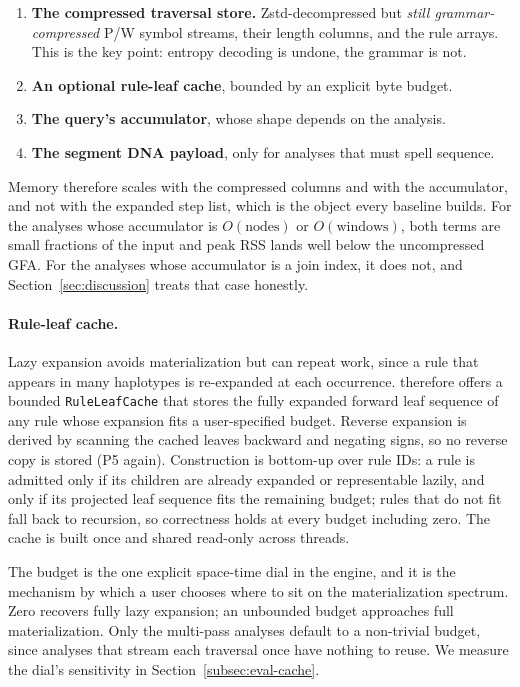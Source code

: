 \begin{enumerate}[noitemsep,topsep=3pt,leftmargin=*]
  \item \textbf{The compressed traversal store.} Zstd-decompressed but
        \emph{still grammar-compressed} P/W symbol streams, their length columns,
        and the rule arrays. This is the key point: entropy decoding is undone,
        the grammar is not.
  \item \textbf{An optional rule-leaf cache}, bounded by an explicit byte budget.
  \item \textbf{The query's accumulator}, whose shape depends on the analysis.
  \item \textbf{The segment DNA payload}, only for analyses that must spell
        sequence.
\end{enumerate}

Memory therefore scales with the compressed columns and with the accumulator, and
not with the expanded step list, which is the object every baseline builds. For
the analyses whose accumulator is $O(\text{nodes})$ or $O(\text{windows})$, both
terms are small fractions of the input and peak RSS lands well below the
uncompressed GFA. For the analyses whose accumulator is a join index, it does not,
and Section~\ref{sec:discussion} treats that case honestly.

\paragraph{Rule-leaf cache.}
Lazy expansion avoids materialization but can repeat work, since a rule that
appears in many haplotypes is re-expanded at each occurrence. \sys therefore
offers a bounded \texttt{RuleLeafCache} that stores the fully expanded forward
leaf sequence of any rule whose expansion fits a user-specified budget. Reverse
expansion is derived by scanning the cached leaves backward and negating signs, so
no reverse copy is stored (P5 again). Construction is bottom-up over rule IDs: a
rule is admitted only if its children are already expanded or representable
lazily, and only if its projected leaf sequence fits the remaining budget; rules
that do not fit fall back to recursion, so correctness holds at every budget
including zero. The cache is built once and shared read-only across threads.

The budget is the one explicit space-time dial in the engine, and it is the
mechanism by which a user chooses where to sit on the materialization spectrum.
Zero recovers fully lazy expansion; an unbounded budget approaches full
materialization. Only the multi-pass analyses default to a non-trivial budget,
since analyses that stream each traversal once have nothing to reuse. We measure
the dial's sensitivity in Section~\ref{subsec:eval-cache}.

